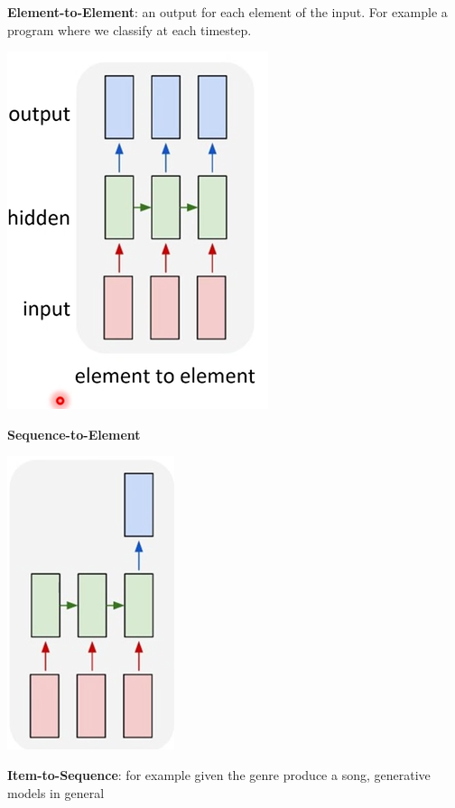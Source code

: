 \documentclass[10pt]{report}
\begin{document}
\begin{list}{}{}
	\item \textbf{Element-to-Element}: an output for each element of the input. For example a program where we classify at each timestep.
	\begin{center}
		\includegraphics[scale=0.5]{86.png}
	\end{center}
	\item \textbf{Sequence-to-Element}
	\begin{center}
		\includegraphics[scale=0.5]{87.png}
	\end{center}
	\item \textbf{Item-to-Sequence}: for example given the genre produce a song, generative models in general
	\begin{center}

\end{center}
\end{list}
\end{document}
